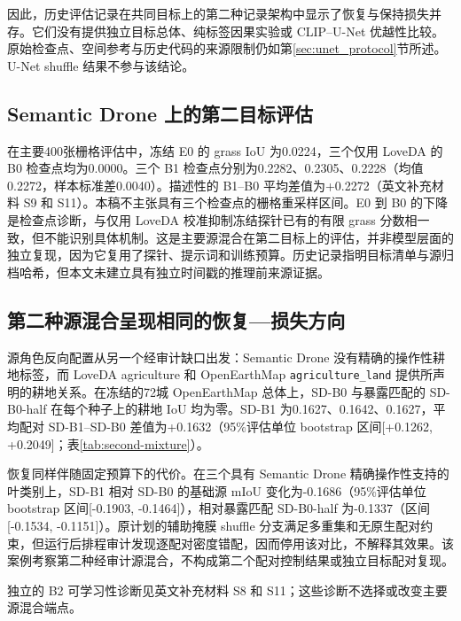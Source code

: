 因此，历史评估记录在共同目标上的第二种记录架构中显示了恢复与保持损失并存。它们没有提供独立目标总体、纯标签因果实验或 CLIP--U-Net 优越性比较。原始检查点、空间参考与历史代码的来源限制仍如第\ref{sec:unet_protocol}节所述。U-Net shuffle 结果不参与该结论。


\subsection{Semantic Drone 上的第二目标评估}
\label{sec:semanticdrone_result}
在主要400张栅格评估中，冻结 E0 的 grass IoU 为0.0224，三个仅用 LoveDA 的 B0 检查点均为0.0000。三个 B1 检查点分别为0.2282、0.2305、0.2228（均值0.2272，样本标准差0.0040）。描述性的 B1--B0 平均差值为+0.2272（英文补充材料 S9 和 S11）。本稿不主张具有三个检查点的栅格重采样区间。E0 到 B0 的下降是检查点诊断，与仅用 LoveDA 校准抑制冻结探针已有的有限 grass 分数相一致，但不能识别具体机制。这是主要源混合在第二目标上的评估，并非模型层面的独立复现，因为它复用了探针、提示词和训练预算。历史记录指明目标清单与源归档哈希，但本文未建立具有独立时间戳的推理前来源证据。

\subsection{第二种源混合呈现相同的恢复—损失方向}
\label{sec:second_mixture_result}
源角色反向配置从另一个经审计缺口出发：Semantic Drone 没有精确的操作性耕地标签，而 LoveDA agriculture 和 OpenEarthMap \texttt{agriculture\_land} 提供所声明的耕地关系。在冻结的72城 OpenEarthMap 总体上，SD-B0 与暴露匹配的 SD-B0-half 在每个种子上的耕地 IoU 均为零。SD-B1 为0.1627、0.1642、0.1627，平均配对 SD-B1--SD-B0 差值为+0.1632（95\%评估单位 bootstrap 区间[+0.1262, +0.2049]；表\ref{tab:second-mixture}）。

恢复同样伴随固定预算下的代价。在三个具有 Semantic Drone 精确操作性支持的叶类别上，SD-B1 相对 SD-B0 的基础源 mIoU 变化为-0.1686（95\%评估单位 bootstrap 区间[-0.1903, -0.1464]），相对暴露匹配 SD-B0-half 为-0.1337（区间[-0.1534, -0.1151]）。原计划的辅助掩膜 shuffle 分支满足多重集和无原生配对约束，但运行后排程审计发现逐配对密度错配，因而停用该对比，不解释其效果。该案例考察第二种经审计源混合，不构成第二个配对控制结果或独立目标配对复现。


独立的 B2 可学习性诊断见英文补充材料 S8 和 S11；这些诊断不选择或改变主要源混合端点。
